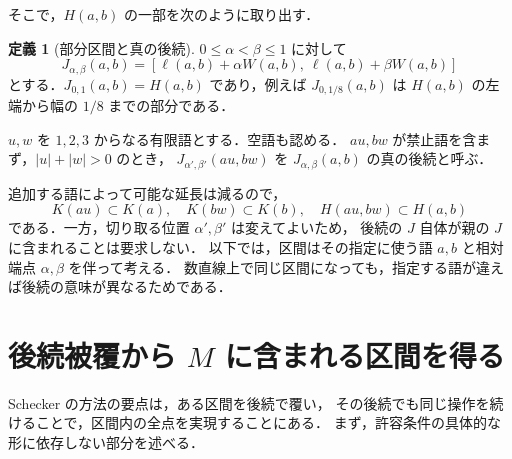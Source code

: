 \documentclass[11pt,a4paper]{article}
\theoremstyle{definition}
\newtheorem{definition}{定義}
\begin{document}
そこで，$H(a,b)$ の一部を次のように取り出す．
\begin{definition}[部分区間と真の後続]\label{def:J}
$0\le\alpha<\beta\le1$ に対して
\begin{equation}\label{eq:J}
 J_{\alpha,\beta}(a,b)
   =[\ell(a,b)+\alpha W(a,b),\ \ell(a,b)+\beta W(a,b)]
\end{equation}
とする．$J_{0,1}(a,b)=H(a,b)$ であり，例えば $J_{0,1/8}(a,b)$ は
$H(a,b)$ の左端から幅の $1/8$ までの部分である．

$u,w$ を $1,2,3$ からなる有限語とする．空語も認める．
$au,bw$ が禁止語を含まず，$|u|+|w|>0$ のとき，
$J_{\alpha',\beta'}(au,bw)$ を $J_{\alpha,\beta}(a,b)$ の真の後続と呼ぶ．
\end{definition}
追加する語によって可能な延長は減るので，
\begin{equation}\label{eq:hull-nesting}
 K(au)\subset K(a),\quad K(bw)\subset K(b),\quad H(au,bw)\subset H(a,b)
\end{equation}
である．一方，切り取る位置 $\alpha',\beta'$ は変えてよいため，
後続の $J$ 自体が親の $J$ に含まれることは要求しない．
以下では，区間はその指定に使う語 $a,b$ と相対端点 $\alpha,\beta$ を伴って考える．
数直線上で同じ区間になっても，指定する語が違えば後続の意味が異なるためである．

\section{後続被覆から \texorpdfstring{$M$}{M} に含まれる区間を得る}
\label{sec:principle}

Schecker の方法の要点は，ある区間を後続で覆い，
その後続でも同じ操作を続けることで，区間内の全点を実現することにある．
まず，許容条件の具体的な形に依存しない部分を述べる．
\end{document}
